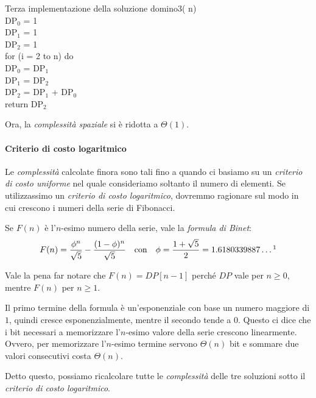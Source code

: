 \begin{minicode}{Terza implementazione della soluzione}
    \ind{} domino3( n)\\
         DP$_0$ = 1\\
         DP$_1$ = 1\\
         DP$_2$ = 1\\
        \indf for (i = 2 to n) do\\
            DP$_0$ = DP$_1$\\
            DP$_1$ = DP$_2$\\
            DP$_2$ = DP$_1$ + DP$_0$\\
        \indf return DP$_2$
\end{minicode}\noindent
Ora, la \emph{complessità spaziale} si è ridotta a $\Theta(1)$.

\paragraph{Criterio di costo logaritmico}
Le \emph{complessità} calcolate finora sono tali fino a quando ci basiamo su
un \emph{criterio di costo uniforme} nel quale consideriamo soltanto il
numero di elementi. Se utilizzassimo un \emph{criterio di costo logaritmico},
dovremmo ragionare sul modo in cui crescono i numeri della serie di Fibonacci.

\noindent
Se $F(n)$ è l'$n$-esimo numero della serie, vale la \emph{formula di Binet}:
\[F(n)=\frac{\phi^n}{\sqrt{5}}-\frac{(1-\phi)^n}{\sqrt{5}}\quad\text{con}
\quad\phi=\frac{1+\sqrt{5}}{2}=1.6180339887\dots\footnotemark\]
\begin{note}
    Vale la pena far notare che $F(n)=DP[n-1]$ perché $DP$ vale per $n\geq0$,
    mentre $F(n)$ per $n\geq1$.
\end{note}\noindent
Il primo termine della formula è un'esponenziale con base un numero maggiore di $1$,
quindi cresce esponenzialmente, mentre il secondo tende a $0$. Questo ci dice
che i bit necessari a memorizzare l'$n$-esimo valore della serie crescono
linearmente. Ovvero, per memorizzare l'$n$-esimo termine servono $\Theta(n)$ bit
e sommare due valori consecutivi costa $\Theta(n)$.


Detto questo, possiamo ricalcolare tutte le \emph{complessità} delle tre soluzioni
sotto il \emph{criterio di costo logaritmico}.

